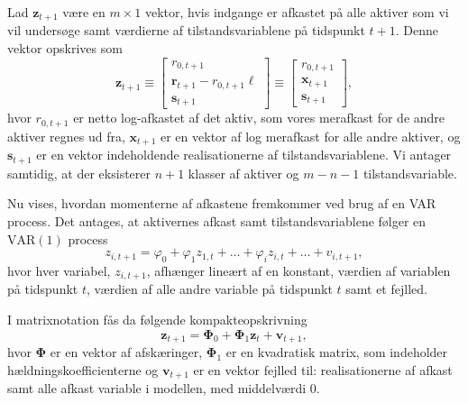 \documentclass[
  a4paper,
  oneside]{memoir}
\begin{document}
Lad \(\bm{z}_{t+1}\) være en \(m\times 1\) vektor, hvis indgange er afkastet på alle aktiver som vi vil undersøge samt værdierne af tilstandsvariablene på tidspunkt \(t+1\). Denne vektor opskrives som
\begin{equation}
        \bm{z}_{t+1}\equiv
        \begin{bmatrix}
        r_{0,t+1}\\
        \bm{r}_{t+1}-r_{0,t+1}\bm{\ell}\\
        \bm{s}_{t+1}
        \end{bmatrix}\equiv
        \begin{bmatrix}
        r_{0,t+1}\\
        \bm{x}_{t+1}\\
        \bm{s}_{t+1}
        \end{bmatrix},
    \end{equation}
hvor \(r_{0,t+1}\) er netto log-afkastet af det aktiv, som vores merafkast for de andre aktiver regnes ud fra, \(\bm{x}_{t+1}\) er en vektor af log merafkast for alle andre aktiver, og \(\bm{s}_{t+1}\) er en vektor indeholdende realisationerne af tilstandsvariablene. Vi antager samtidig, at der eksisterer \(n+1\) klasser af aktiver og \(m-n-1\) tilstandsvariable.

\vspace{5mm}

Nu vises, hvordan momenterne af afkastene fremkommer ved brug af en VAR process. Det antages, at aktivernes afkast samt tilstandsvariablene følger en \(\text{VAR}(1)\) process
\begin{equation}
        z_{i,t+1}=\varphi_0+\varphi_1 z_{1,t}+\dots+\varphi_i z_{i,t}+\dots+v_{i,t+1},
    \end{equation}
hvor hver variabel, \(z_{i,t+1}\), afhænger lineært af en konstant, værdien af variablen på tidspunkt \(t\), værdien af alle andre variable på tidspunkt \(t\) samt et fejlled.

\vspace{5mm}

I matrixnotation fås da følgende kompakteopskrivning
\begin{equation}\label{eq:1}
        \bm{z}_{t+1}=\bm{\Phi}_0+\bm{\Phi}_1\bm{z}_t+\bm{v}_{t+1},
    \end{equation}
hvor \(\bm{\Phi}\) er en vektor af afskæringer, \(\bm{\Phi}_1\) er en kvadratisk matrix, som indeholder hældningskoefficienterne og \(\bm{v}_{t+1}\) er en vektor fejlled til: realisationerne af afkast samt alle afkast variable i modellen, med middelværdi \(0\).
\end{document}
